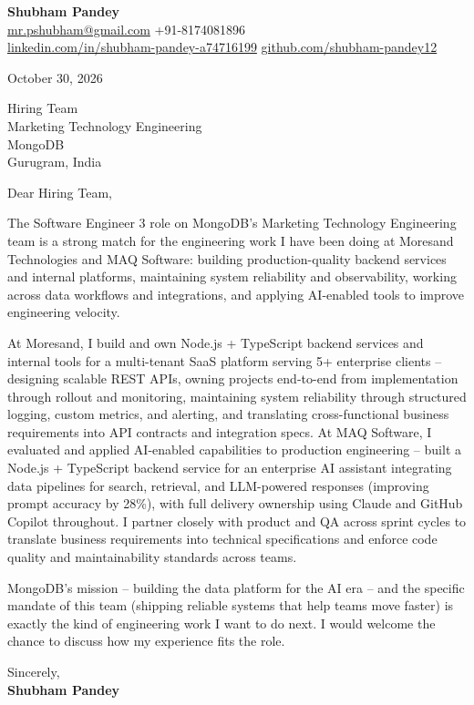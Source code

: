 \documentclass[a4paper,11pt]{article}
\begin{document}
\textbf{\Large Shubham Pandey}\\
\href{mailto:mr.pshubham@gmail.com}{mr.pshubham@gmail.com} \quad +91-8174081896\\
\href{https://www.linkedin.com/in/shubham-pandey-a74716199/}{linkedin.com/in/shubham-pandey-a74716199} \quad
\href{https://github.com/shubham-pandey12}{github.com/shubham-pandey12}

\vspace{1em}
October 30, 2026

\vspace{1em}
Hiring Team\\
Marketing Technology Engineering\\
MongoDB\\
Gurugram, India

\vspace{1em}
Dear Hiring Team,

The Software Engineer 3 role on MongoDB's Marketing Technology Engineering team is a strong match for the engineering work I have been doing at Moresand Technologies and MAQ Software: building production-quality backend services and internal platforms, maintaining system reliability and observability, working across data workflows and integrations, and applying AI-enabled tools to improve engineering velocity.

At Moresand, I build and own Node.js + TypeScript backend services and internal tools for a multi-tenant SaaS platform serving 5+ enterprise clients -- designing scalable REST APIs, owning projects end-to-end from implementation through rollout and monitoring, maintaining system reliability through structured logging, custom metrics, and alerting, and translating cross-functional business requirements into API contracts and integration specs. At MAQ Software, I evaluated and applied AI-enabled capabilities to production engineering -- built a Node.js + TypeScript backend service for an enterprise AI assistant integrating data pipelines for search, retrieval, and LLM-powered responses (improving prompt accuracy by 28\%), with full delivery ownership using Claude and GitHub Copilot throughout. I partner closely with product and QA across sprint cycles to translate business requirements into technical specifications and enforce code quality and maintainability standards across teams.

MongoDB's mission -- building the data platform for the AI era -- and the specific mandate of this team (shipping reliable systems that help teams move faster) is exactly the kind of engineering work I want to do next. I would welcome the chance to discuss how my experience fits the role.

\vspace{1em}
Sincerely,\\[0.5em]
\textbf{Shubham Pandey}
\end{document}
